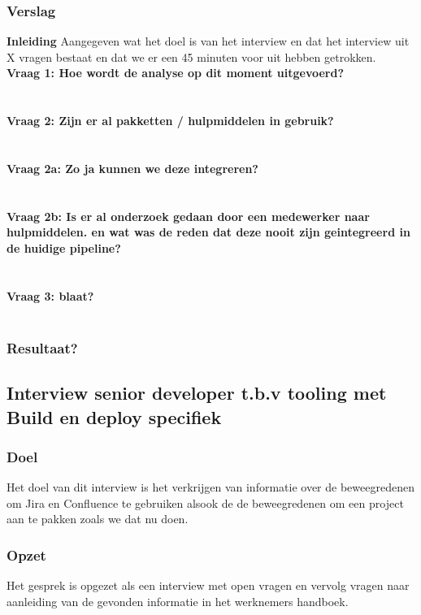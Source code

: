 \subsubsection{Verslag}
\textbf{Inleiding}
Aangegeven wat het doel is van het interview en dat het interview uit X vragen bestaat en dat we er een 45 minuten voor uit hebben getrokken.\\
\textbf{Vraag 1: Hoe wordt de analyse op dit moment uitgevoerd?}\\
\lipsum[01]\\
\\
\textbf{Vraag 2: Zijn er al pakketten / hulpmiddelen in gebruik?}\\
\lipsum[02]\\
\\
\textbf{Vraag 2a: Zo ja kunnen we deze integreren?}\\
\lipsum[03]\\
\\
\textbf{Vraag 2b: Is er al onderzoek gedaan door een medewerker naar hulpmiddelen. en wat was de reden dat deze nooit zijn geintegreerd in de huidige pipeline?}\\
\lipsum[04]\\
\\
\textbf{Vraag 3: blaat?}\\
\lipsum[05]\\

\subsubsection{Resultaat?}

\subsection{Interview senior developer t.b.v tooling met Build en deploy specifiek}
\subsubsection{Doel}
Het doel van dit interview is het verkrijgen van informatie over de beweegredenen om Jira en Confluence te gebruiken alsook de de beweegredenen om een project aan te pakken zoals we dat nu doen.
\subsubsection{Opzet}
Het gesprek is opgezet als een interview met open vragen en vervolg vragen naar aanleiding van de gevonden informatie in het werknemers handboek.

